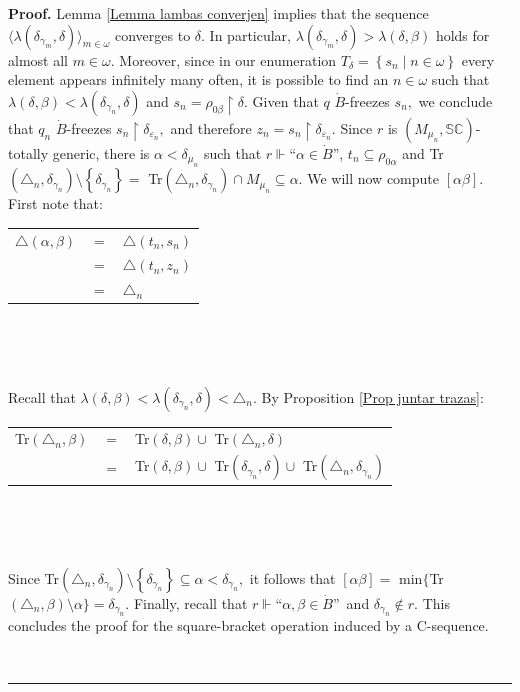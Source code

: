 \documentclass{article}
\newenvironment{proof}[1][Proof]{\noindent\textbf{#1.} }{\ \rule{0.5em}{0.5em}}
\begin{document}
\begin{proof}
Lemma \ref{Lemma lambas converjen} implies that the sequence $\langle
\lambda(\delta_{\gamma_{m}},\delta)\rangle_{m\in\omega}$ converges to
$\delta.$ In particular, $\lambda(\delta_{\gamma_{m}},\delta)>\lambda\left(
\delta,\beta\right)  $ holds for almost all $m\in\omega.$ Moreover, since in
our enumeration $T_{\delta}=\left\{  s_{n}\mid n\in\omega\right\}  $ every
element appears infinitely many often, it is possible to find an $n\in\omega$
such that $\lambda\left(  \delta,\beta\right)  <\lambda(\delta_{\gamma_{n}%
},\delta)$ and $s_{n}=\rho_{0\beta}\upharpoonright\delta.$ Given that $q$
$\dot{B}$-freezes $s_{n},$ we conclude that $q_{n}$ $\dot{B}$-freezes
$s_{n}\upharpoonright\delta_{\varepsilon_{n}},$ and therefore $z_{n}%
=s_{n}\upharpoonright\delta_{\varepsilon_{n}}.$ Since $r$ is $(M_{\mu_{n}%
},\mathbb{SC})$-totally generic, there is $\alpha<\delta_{\mu_{n}}$ such that
$r\Vdash$\textquotedblleft$\alpha\in\dot{B}$\textquotedblright, $t_{n}%
\subseteq\rho_{0\alpha}$ and \textsf{Tr}$(\triangle_{n},\delta_{\gamma_{n}%
})\setminus\left\{  \delta_{\gamma_{n}}\right\}  =$ \textsf{Tr}$(\triangle
_{n},\delta_{\gamma_{n}})\cap M_{\mu_{n}}\subseteq\alpha.$ We will now compute
$\left[  \alpha\beta\right]  .$ First note that:\bigskip

\hfill%
\begin{tabular}
[c]{lll}%
$\triangle\left(  \alpha,\beta\right)  $ & $=$ & $\triangle\left(  t_{n}%
,s_{n}\right)  $\\
& $=$ & $\triangle\left(  t_{n},z_{n}\right)  $\\
& $=$ & $\triangle_{n}$%
\end{tabular}
\hfill\ 

\qquad\ \ \ \qquad\qquad\ \ \ \qquad\medskip

Recall that $\lambda\left(  \delta,\beta\right)  <\lambda(\delta_{\gamma_{n}%
},\delta)<\triangle_{n}.$ By Proposition \ref{Prop juntar trazas}:\bigskip

\hfill%
\begin{tabular}
[c]{lll}%
\textsf{Tr}$(\triangle_{n},\beta)$ & $=$ & \textsf{Tr}$(\delta,\beta)\cup$
\textsf{Tr}$(\triangle_{n},\delta)$\\
& $=$ & \textsf{Tr}$(\delta,\beta)\cup$ \textsf{Tr}$(\delta_{\gamma_{n}%
},\delta)\cup$ \textsf{Tr}$(\triangle_{n},\delta_{\gamma_{n}})$%
\end{tabular}
\hfill\ 

\ \ \ \ \ \medskip

Since \textsf{Tr}$(\triangle_{n},\delta_{\gamma_{n}})\setminus\left\{
\delta_{\gamma_{n}}\right\}  \subseteq\alpha<\delta_{\gamma_{n}},$ it follows
that \newline$\left[  \alpha\beta\right]  =$ \textsf{min}$\{$\textsf{Tr}%
$(\triangle_{n},\beta)\setminus\alpha\}=\delta_{\gamma_{n}}.$ Finally, recall
that $r\Vdash$\textquotedblleft$\alpha,\beta\in\dot{B}$\textquotedblright\ and
$\delta_{\gamma_{n}}\notin r.$ This concludes the proof for the square-bracket
operation induced by a \textsf{C}-sequence.


\end{proof}
\end{document}
